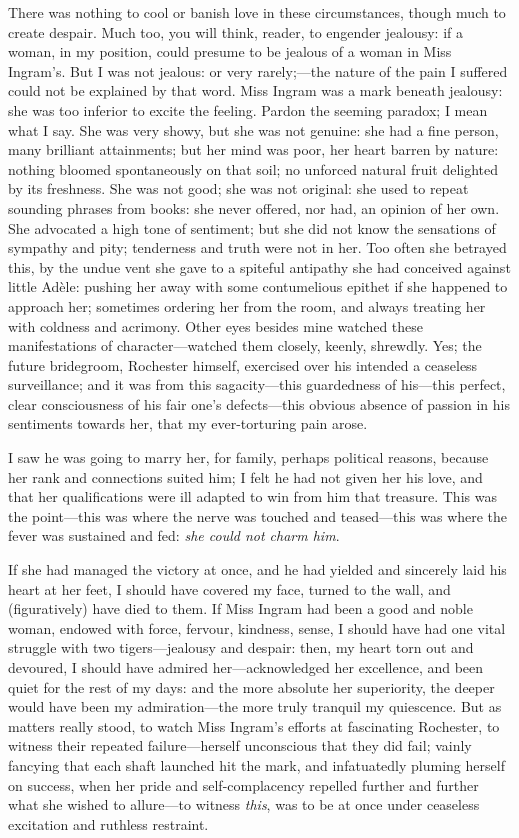 There was nothing to cool or banish love in these circumstances, though
much to create despair. Much too, you will think, reader, to engender
jealousy: if a woman, in my position, could presume to be jealous of a
woman in Miss Ingram's. But I was not jealous: or very rarely;---the
nature of the pain I suffered could not be explained by that word. Miss
Ingram was a mark beneath jealousy: she was too inferior to excite the
feeling. Pardon the seeming paradox; I mean what I say. She was very
showy, but she was not genuine: she had a fine person, many brilliant
attainments; but her mind was poor, her heart barren by nature: nothing
bloomed spontaneously on that soil; no unforced natural fruit delighted
by its freshness. She was not good; she was not original: she used to
repeat sounding phrases from books: she never offered, nor had, an
opinion of her own. She advocated a high tone of sentiment; but she did
not know the sensations of sympathy and pity; tenderness and truth were
not in her. Too often she betrayed this, by the undue vent she gave to
a spiteful antipathy she had conceived against little Adèle: pushing her
away with some contumelious epithet if she happened to approach her;
sometimes ordering her from the room, and always treating her with
coldness and acrimony. Other eyes besides mine watched these
manifestations of character---watched them closely, keenly, shrewdly. 
Yes; the future bridegroom, \Mr{} Rochester himself, exercised over his
intended a ceaseless surveillance; and it was from this sagacity---this
guardedness of his---this perfect, clear consciousness of his fair one's
defects---this obvious absence of passion in his sentiments towards her,
that my ever-torturing pain arose.

I saw he was going to marry her, for family, perhaps political reasons,
because her rank and connections suited him; I felt he had not given her
his love, and that her qualifications were ill adapted to win from him
that treasure. This was the point---this was where the nerve was
touched and teased---this was where the fever was sustained and fed:
\emph{she could not charm him}.

If she had managed the victory at once, and he had yielded and sincerely
laid his heart at her feet, I should have covered my face, turned to the
wall, and (figuratively) have died to them. If Miss Ingram had been a
good and noble woman, endowed with force, fervour, kindness, sense, I
should have had one vital struggle with two tigers---jealousy and
despair: then, my heart torn out and devoured, I should have admired
her---acknowledged her excellence, and been quiet for the rest of my
days: and the more absolute her superiority, the deeper would have been
my admiration---the more truly tranquil my quiescence. But as matters
really stood, to watch Miss Ingram's efforts at fascinating \Mr{}
 Rochester, to witness their repeated failure---herself unconscious that
they did fail; vainly fancying that each shaft launched hit the mark,
and infatuatedly pluming herself on success, when her pride and
self-complacency repelled further and further what she wished to
allure---to witness \emph{this}, was to be at once under ceaseless
excitation and ruthless restraint.

